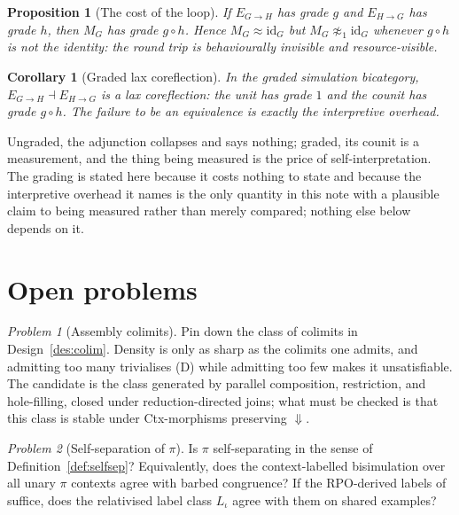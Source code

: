 \documentclass[11pt,a4paper]{article}
\theoremstyle{definition}
\theoremstyle{plain}
\newtheorem{proposition}[definition]{Proposition}
\newtheorem{corollary}[definition]{Corollary}
\theoremstyle{remark}
\newtheorem{problem}{Problem}
\newcommand{\bisim}{\approx}
\newcommand{\obs}{\Downarrow}
\begin{document}
\begin{proposition}[The cost of the loop]
\label{prop:loop-cost}
If $E_{G\to H}$ has grade $g$ and $E_{H\to G}$ has grade $h$, then $M_G$ has grade
$g \circ h$. Hence $M_G \bisim \mathrm{id}_G$ but $M_G \not\bisim_{1} \mathrm{id}_G$
whenever $g\circ h$ is not the identity: the round trip is behaviourally invisible and
resource-visible.
\end{proposition}

\begin{corollary}[Graded lax coreflection]
\label{cor:lax}
In the graded simulation bicategory, $E_{G\to H} \dashv E_{H\to G}$ is a lax
coreflection: the unit has grade $1$ and the counit has grade $g \circ h$. The
failure to be an equivalence is exactly the interpretive overhead.
\end{corollary}

Ungraded, the adjunction collapses and says nothing; graded, its counit is a
measurement, and the thing being measured is the price of self-interpretation. The
grading is stated here because it costs nothing to state and because the interpretive
overhead it names is the only quantity in this note with a plausible claim to being
measured rather than merely compared; nothing else below depends on it.

\section{Open problems}
\label{sec:open}

\begin{problem}[Assembly colimits]
\label{prob:colim}
Pin down the class of colimits in Design~\ref{des:colim}. Density is only as sharp as
the colimits one admits, and admitting too many trivialises (D) while admitting too
few makes it unsatisfiable. The candidate is the class generated by parallel
composition, restriction, and hole-filling, closed under reduction-directed joins;
what must be checked is that this class is stable under Ctx-morphisms preserving
$\obs$.
\end{problem}

\begin{problem}[Self-separation of $\pi$]
\label{prob:rpo}
Is $\pi$ self-separating in the sense of Definition~\ref{def:selfsep}? Equivalently,
does the context-labelled bisimulation over all unary $\pi$ contexts agree with
barbed congruence? If the RPO-derived labels of \cite{leifer-milner} suffice, does the
relativised label class $L_\iota$ agree with them on shared examples?
\end{problem}
\end{document}
